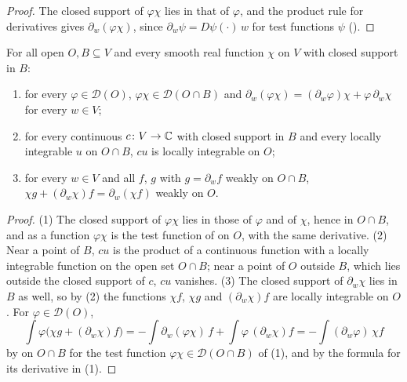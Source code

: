 \begin{proof}
\leanok
The closed support of $\varphi \chi$ lies in that of $\varphi$, and the product rule for
derivatives gives $\partial_w (\varphi \chi)$, since $\partial_w \psi = D\psi(\cdot) \, w$ for
test functions $\psi$ ().
\end{proof}

\begin{lemma}
\label{lem:weak-derivative-product-cutoff}
\leanok
{}
For all open $O, B \subseteq V$ and every smooth real function $\chi$ on $V$ with closed support
in $B$:
\begin{enumerate}
  \item for every $\varphi \in \mathcal D(O)$, $\varphi \chi \in \mathcal D(O \cap B)$ and
    $\partial_w (\varphi \chi) = (\partial_w \varphi) \chi + \varphi \, \partial_w \chi$ for every
    $w \in V$;
  \item for every continuous $c \colon V \to \mathbb{C}$ with closed support in $B$ and every locally
    integrable $u$ on $O \cap B$, $c u$ is locally integrable on $O$;
  \item for every $w \in V$ and all $f$, $g$ with $g = \partial_w f$ weakly on $O \cap B$,
    $\chi g + (\partial_w \chi) f = \partial_w (\chi f)$ weakly on $O$.
\end{enumerate}
\end{lemma}

\begin{proof}
\leanok
(1) The closed support of $\varphi \chi$ lies in those of $\varphi$ and of $\chi$, hence in
$O \cap B$, and as a function $\varphi \chi$ is the test function of
 on $O$, with the same derivative. (2) Near a point of $B$, $c u$
is the product of a continuous function with a locally integrable function on the open set
$O \cap B$; near a point of $O$ outside $B$, which lies outside the closed support of $c$, $c u$
vanishes. (3) The closed support of $\partial_w \chi$ lies in $B$ as well, so by (2) the functions
$\chi f$, $\chi g$ and $(\partial_w \chi) f$ are locally integrable on $O$. For
$\varphi \in \mathcal D(O)$,
\[
  \int \varphi \bigl(\chi g + (\partial_w \chi) f\bigr) = -\int \partial_w(\varphi \chi) \, f
  + \int \varphi \, (\partial_w \chi) f = -\int (\partial_w \varphi) \, \chi f
\]
by  on $O \cap B$ for the test function
$\varphi \chi \in \mathcal D(O \cap B)$ of (1), and by the formula for its derivative in (1).
\end{proof}

